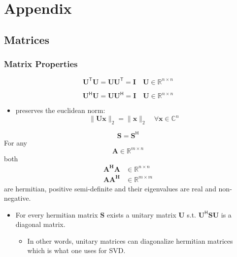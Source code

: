 \section{Appendix}
\subsection{Matrices}
\subsubsection{Matrix Properties}\label{app:mat_prop}

\noindent\begin{equation*}
    \mathbf{U}^{\mathsf{T}}\mathbf{U}=\mathbf{UU}^{\mathsf{T}}=\mathbf{I}\quad \mathbf{U}\in \mathbb{R}^{n\times n}
\end{equation*}

\noindent\begin{equation*}
    \mathbf{U}^{\mathsf{H}}\mathbf{U}=\mathbf{UU}^{\mathsf{H}}=\mathbf{I}\quad \mathbf{U}\in \mathbb{R}^{n\times n}
\end{equation*}
\begin{itemize}
    \item preserves the euclidean norm:
          \noindent\begin{equation*}
              \|\mathbf{Ux}\| _2=\|\mathbf{x}\|_2 \quad \forall \mathbf{x} \in \mathbb{C}^n
          \end{equation*}
\end{itemize}

\noindent\begin{equation*}
    \mathbf{S}=\mathbf{S}^{\mathsf{H}}
\end{equation*}
For any
\noindent\begin{equation*}
    \mathbf{A} \in \mathbb{R}^{m\times n}
\end{equation*}
both
\noindent\begin{align*}
    \mathbf{A^H A} & \in \mathbb{R}^{n\times n} \\
    \mathbf{A A^H} & \in \mathbb{R}^{m\times m}
\end{align*}
are hermitian, positive semi-definite and their eigenvalues are real and non-negative.
\begin{itemize}
    \item For every hermitian matrix $\mathbf{S}$ exists a unitary matrix $\mathbf{U}$ s.t. $\mathbf{U}^{\mathsf{H}}\mathbf{SU}$ is a diagonal matrix.
          \begin{itemize}
              \item In other words, unitary matrices can diagonalize hermitian matrices which is what one uses for SVD.
          \end{itemize}
\end{itemize}

